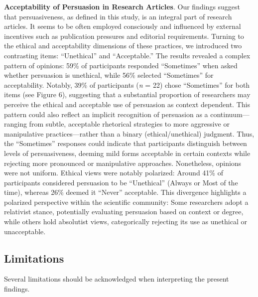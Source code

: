 \documentclass[authordate, meta]{jote-new-article}
\begin{document}
	\textbf{Acceptability of Persuasion in Research Articles}. Our findings suggest that persuasiveness, as defined in this study, is an integral part of research articles. It seems to be often employed consciously and influenced by external incentives such as publication pressures and editorial requirements. Turning to the ethical and acceptability dimensions of these practices, we introduced two contrasting items: “Unethical” and “Acceptable.” The results revealed a complex pattern of opinions: 59\% of participants responded “Sometimes” when asked whether persuasion is unethical, while 56\% selected “Sometimes” for acceptability. Notably, 39\% of participants (\emph{n} = 22) chose “Sometimes” for both items (see Figure 6), suggesting that a substantial proportion of researchers may perceive the ethical and acceptable use of persuasion as context dependent. This pattern could also reflect an implicit recognition of persuasion as a continuum—ranging from subtle, acceptable rhetorical strategies to more aggressive or manipulative practices—rather than a binary (ethical/unethical) judgment. Thus, the “Sometimes” responses could indicate that participants distinguish between levels of persuasiveness, deeming mild forms acceptable in certain contexts while rejecting more pronounced or manipulative approaches. Nonetheless, opinions were not uniform. Ethical views were notably polarized: Around 41\% of participants considered persuasion to be “Unethical” (Always or Most of the time), whereas 26\% deemed it “Never” acceptable. This divergence highlights a polarized perspective within the scientific community: Some researchers adopt a relativist stance, potentially evaluating persuasion based on context or degree, while others hold absolutist views, categorically rejecting its use as unethical or unacceptable.



	\subsection{Limitations}



	Several limitations should be acknowledged when interpreting the present findings.
\end{document}
